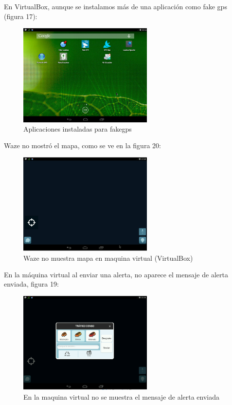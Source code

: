 En VirtualBox, aunque se instalamos más de una aplicación como fake gps (figura 17):


        \begin{figure}[H]
  \begin{center}
    \includegraphics[width=0.6\textwidth]{imagenes/fig31.png}
    \caption{Aplicaciones instaladas para fakegps}
  \end{center}
\end{figure}


Waze no mostró el mapa, como se ve en la figura 20:

        \begin{figure}[H]
  \begin{center}
    \includegraphics[width=0.6\textwidth]{imagenes/fig32.png}
    \caption{Waze no muestra mapa en maquina virtual (VirtualBox) }
  \end{center}
\end{figure}

En la máquina virtual al enviar una alerta, no aparece el mensaje de alerta enviada, figura 19:

        \begin{figure}[H]
  \begin{center}
    \includegraphics[width=0.6\textwidth]{imagenes/fig33.png}
    \caption{En la maquina virtual no se muestra el mensaje de alerta enviada}
  \end{center}
\end{figure}

